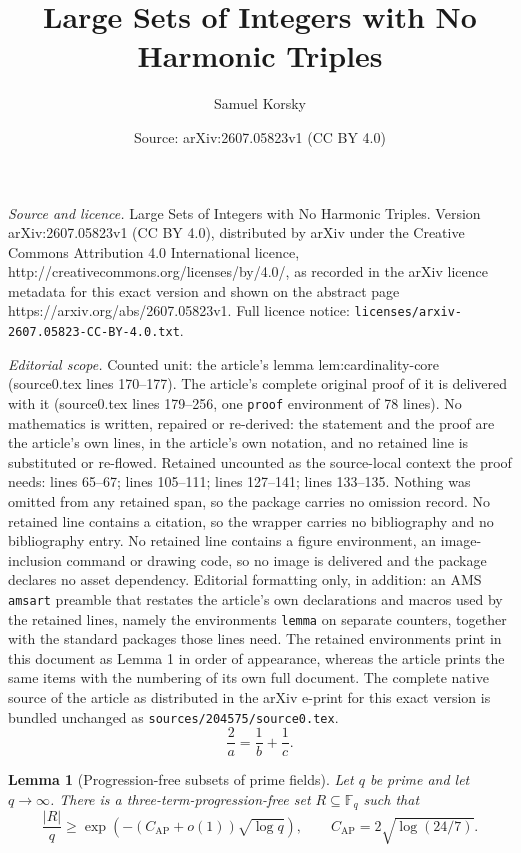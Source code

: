 \documentclass[10pt,a4paper]{amsart}
\title{Large Sets of Integers with No Harmonic Triples}
\author{Samuel Korsky}
\date{Source: arXiv:2607.05823v1 (CC BY 4.0)}
\newtheorem{lemma}{Lemma}
\newcommand{\AP}{\mathrm{AP}}
\newcommand{\F}{\mathbb F}
\begin{document}
\maketitle

\noindent\emph{Source and licence.} Large Sets of Integers with No Harmonic Triples. Version arXiv:2607.05823v1 (CC BY 4.0), distributed by arXiv under the Creative Commons Attribution 4.0 International licence, http://creativecommons.org/licenses/by/4.0/, as recorded in the arXiv licence metadata for this exact version and shown on the abstract page https://arxiv.org/abs/2607.05823v1. Full licence notice: \texttt{licenses/arxiv-2607.05823-CC-BY-4.0.txt}.\par\smallskip

\noindent\textit{Editorial scope.} Counted unit: the article's lemma lem:cardinality-core (source0.tex lines 170--177). The article's complete original proof of it is delivered with it (source0.tex lines 179--256, one \texttt{proof} environment of 78 lines). No mathematics is written, repaired or re-derived: the statement and the proof are the article's own lines, in the article's own notation, and no retained line is substituted or re-flowed.  Retained uncounted as the source-local context the proof needs: lines 65--67; lines 105--111; lines 127--141; lines 133--135.  Nothing was omitted from any retained span, so the package carries no omission record.  No retained line contains a citation, so the wrapper carries no bibliography and no bibliography entry.  No retained line contains a figure environment, an image-inclusion command or drawing code, so no image is delivered and the package declares no asset dependency.  Editorial formatting only, in addition: an AMS \texttt{amsart} preamble that restates the article's own declarations and macros used by the retained lines, namely the environments \texttt{lemma} on separate counters, together with the standard packages those lines need.  The retained environments print in this document as Lemma 1 in order of appearance, whereas the article prints the same items with the numbering of its own full document.  The complete native source of the article as distributed in the arXiv e-print for this exact version is bundled unchanged as \texttt{sources/204575/source0.tex}.
\begin{equation}\label{eq:harmonic-equation}
  \frac2a=\frac1b+\frac1c .
\end{equation}

\begin{lemma}[Progression-free subsets of prime fields]\label{lem:finite-field-input}
Let $q$ be prime and let $q\to\infty$.  There is a three-term-progression-free set $R\subseteq\F_q$ such that
\[
  \frac{|R|}{q}\ge \exp\!\left(-(C_{\AP}+o(1))\sqrt{\log q}\right),
  \qquad C_{\AP}=2\sqrt{\log(24/7)} .
\]
\end{lemma}
\end{document}
